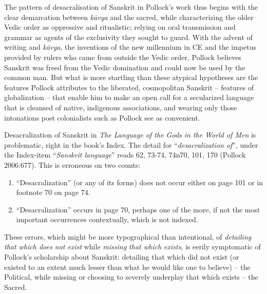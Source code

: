 The pattern of desacralisation of Sanskrit in Pollock’s work thus begins with the clear demarcation between \textit{kāvya} and the sacred, while characterizing the older Vedic order as oppressive and ritualistic; relying on oral transmission and grammar as agents of the exclusivity they sought to guard. With the advent of writing and \textit{kāvya}, the inventions of the new millennium in CE and the impetus provided by rulers who came from outside the Vedic order, Pollock believes Sanskrit was freed from the Vedic domination and could now be used by the common man. But what is more startling than these atypical hypotheses are the features Pollock attributes to the liberated, cosmopolitan Sanskrit – features of globalization – that enable him to make an open call for a secularized language that is cleansed of native, indigenous associations, and wearing only those intonations post colonialists such as Pollock see as convenient.

Desacralization of Sanskrit in \textit{The Language of the Gods in the World of Men} is problematic, right in the book’s Index. The detail for “\textit{desacralization of}”, under the Index-item “\textit{Sanskrit language}” reads 62, 73-74, 74n70, 101, 170 (Pollock 2006:677). This is erroneous on two counts:
\begin{enumerate}[topsep=0pt]
\itemsep=0pt
\item “Desacralization” (or any of its forms) does not occur either on page 101 or in footnote 70 on page 74.

 \item “Desacralization” occurs in page 70, perhaps one of the more, if not the most important occurrences contextually, which is not indexed.

\end{enumerate}

These errors, which might be more typographical than intentional, of \textit{detailing that which does not exist} while \textit{missing that which exists}, is eerily symptomatic of Pollock’s scholarship about Sanskrit: detailing that which did not exist (or existed to an extent much lesser than what he would like one to believe) – the Political, while missing\textit{} or choosing to severely underplay that which exists – the Sacred.

